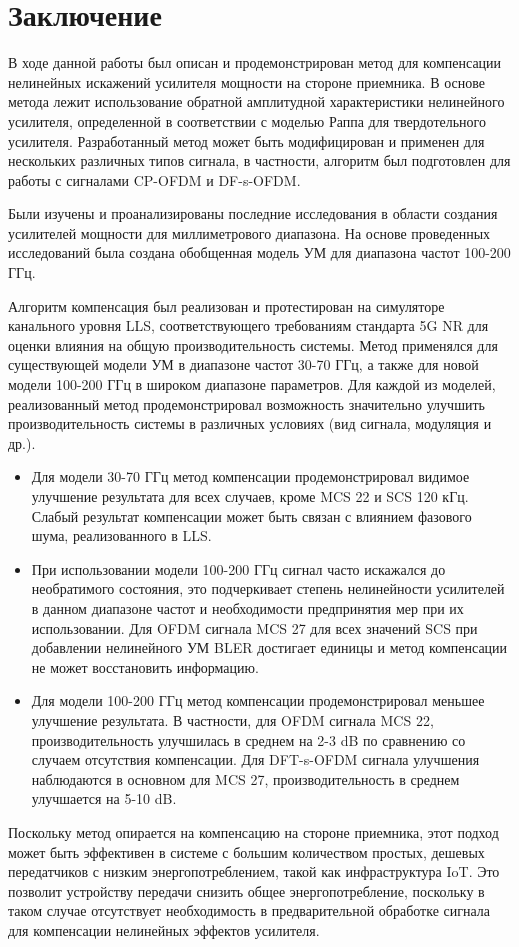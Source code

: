 \section{Заключение}

В ходе данной работы был описан и продемонстрирован метод для компенсации
нелинейных искажений усилителя мощности на стороне приемника. В основе
метода лежит использование обратной амплитудной характеристики нелинейного
усилителя, определенной в соответствии с моделью Раппа для твердотельного
усилителя. Разработанный метод может быть модифицирован и применен для
нескольких различных типов сигнала, в частности, алгоритм был подготовлен
для работы с сигналами CP-OFDM и DF-s-OFDM.

Были изучены и проанализированы последние исследования в области создания
усилителей мощности для миллиметрового диапазона. На основе проведенных
исследований была создана обобщенная модель УМ для диапазона частот 100-200
ГГц.

Алгоритм компенсация был реализован и протестирован на симуляторе
канального уровня LLS, соответствующего требованиям стандарта 5G NR для
оценки влияния на общую производительность системы. Метод применялся для
существующей модели УМ в диапазоне частот 30-70 ГГц, а также для новой
модели 100-200 ГГц в широком диапазоне параметров. Для каждой из моделей,
реализованный метод продемонстрировал возможность значительно улучшить
производительность системы в различных условиях (вид сигнала, модуляция и
др.).
\begin{itemize}
    \item Для модели 30-70 ГГц метод компенсации продемонстрировал видимое
    улучшение результата для всех случаев, кроме MCS 22 и SCS 120 кГц. Слабый
    результат компенсации может быть связан с влиянием фазового шума,
    реализованного в LLS.
    \item При использовании модели 100-200 ГГц сигнал часто искажался до
    необратимого состояния, это подчеркивает степень нелинейности
    усилителей в данном диапазоне частот и необходимости предпринятия мер
    при их использовании. Для OFDM сигнала MCS 27 для всех значений SCS при
    добавлении нелинейного УМ BLER достигает единицы и метод компенсации не
    может восстановить информацию.
    \item Для модели 100-200 ГГц метод компенсации продемонстрировал меньшее
    улучшение результата. В частности, для OFDM сигнала MCS 22, производительность
    улучшилась в среднем на 2-3 dB по сравнению со случаем отсутствия
    компенсации. Для DFT-s-OFDM сигнала улучшения наблюдаются в основном для
    MCS 27, производительность в среднем улучшается на 5-10 dB.
\end{itemize}

Поскольку метод опирается на компенсацию на стороне приемника, этот
подход может быть эффективен в системе с большим количеством простых,
дешевых передатчиков с низким энергопотреблением, такой как инфраструктура
IoT. Это позволит устройству передачи снизить общее энергопотребление,
поскольку в таком случае отсутствует необходимость в предварительной
обработке сигнала для компенсации нелинейных эффектов усилителя.